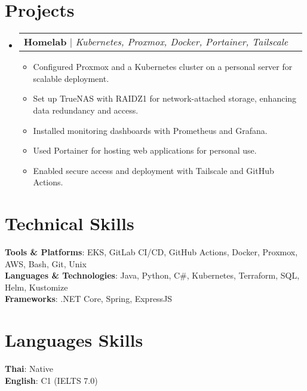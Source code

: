 \documentclass[letterpaper,11pt]{article}
\makeatletter
\newcommand{\resumeItem}[1]{
  \item\small{
    {#1 \vspace{-2pt}}
  }
}
\newcommand{\resumeProjectHeading}[2]{
    \item
    \begin{tabular*}{0.97\textwidth}{l@{\extracolsep{\fill}}r}
      \small#1 & #2 \\
    \end{tabular*}\vspace{-7pt}
}
\newcommand{\resumeSubHeadingListStart}{\begin{itemize}[leftmargin=0.15in, label={}]}
\newcommand{\resumeSubHeadingListEnd}{\end{itemize}}
\newcommand{\resumeItemListStart}{\begin{itemize}}
\newcommand{\resumeItemListEnd}{\end{itemize}\vspace{-5pt}}
\makeatother
\begin{document}
\section{Projects}
    \resumeSubHeadingListStart
      \resumeProjectHeading
        {\textbf{Homelab} $|$ \emph{Kubernetes, Proxmox, Docker, Portainer, Tailscale}}{}
        \resumeItemListStart
          \resumeItem{Configured Proxmox and a Kubernetes cluster on a personal server for scalable deployment.}
          \resumeItem{Set up TrueNAS with RAIDZ1 for network-attached storage, enhancing data redundancy and access.}
          \resumeItem{Installed monitoring dashboards with Prometheus and Grafana.}
          \resumeItem{Used Portainer for hosting web applications for personal use.}
          \resumeItem{Enabled secure access and deployment with Tailscale and GitHub Actions.}
        \resumeItemListEnd
    \resumeSubHeadingListEnd

\section{Technical Skills}
  \begin{itemize}[leftmargin=0.15in, label={}]
    \small{\item{
      \textbf{Tools \& Platforms}{: EKS, GitLab CI/CD, GitHub Actions, Docker, Proxmox, AWS, Bash, Git, Unix} \\
      \textbf{Languages \& Technologies}{: Java, Python, C\#, Kubernetes, Terraform, SQL, Helm, Kustomize} \\
      \textbf{Frameworks}{: .NET Core, Spring, ExpressJS}
    }}
  \end{itemize}


\section{Languages Skills}
 \begin{itemize}[leftmargin=0.15in, label={}]
    \small{\item{
     \textbf{Thai}{: Native} \\
     \textbf{English}{: C1 (IELTS 7.0)} \\
    }}
 \end{itemize}


\end{document}
